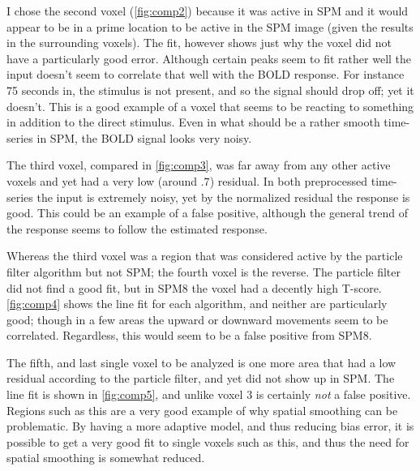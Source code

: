 I chose the second voxel (\autoref{fig:comp2}) because it was active in SPM and it would appear to be in a prime
location to be active in the SPM image (given the results in the surrounding voxels). The fit,
however shows just why the voxel did not have a particularly good error. Although certain peaks 
seem to fit rather well the input doesn't seem to correlate that well with the BOLD response. For
instance 75 seconds in, the stimulus is not present, and so the signal should drop off; yet
it doesn't. This is a good example of a voxel that seems to be reacting to something in addition to
the direct stimulus. Even in what should be a rather smooth time-series in SPM, the BOLD signal
looks very noisy. 

The third voxel, compared in \autoref{fig:comp3}, was far away from any other active voxels 
and yet had a very low (around $.7$) residual.
In both preprocessed time-series the input is extremely noisy, yet by the normalized residual 
the response is good. This could be an example of a false positive, although the general trend
of the response seems to follow the estimated response. 

Whereas the third voxel was a region that was considered active by the particle filter
algorithm but not SPM; the fourth voxel is the reverse. The particle filter did not
find a good fit, but in SPM8 the voxel had a decently high T-score. \autoref{fig:comp4} shows
the line fit for each algorithm, and neither are particularly good; though in a few areas
the upward or downward movements seem to be correlated. Regardless, this would seem to be
a false positive from SPM8. 

The fifth, and last single voxel to be analyzed is one more area that had a low residual according
to the particle filter, and yet did not show up in SPM. The line fit is shown in \autoref{fig:comp5},
and unlike voxel 3 is certainly \emph{not} a false positive. Regions such as this are a very 
good example of why spatial smoothing can be problematic. By having a more adaptive model, and
thus reducing bias error, it is possible to get a very good fit to single voxels such as this,
and thus the need for spatial smoothing is somewhat reduced. 

